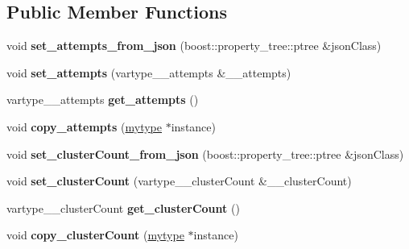 \subsection*{Public Member Functions}
\begin{DoxyCompactItemize}
\item 
\mbox{\label{classfilter_1_1algos_1_1_kmeans_a0201c86dca1b5ab33220846e1782e0f4}} 
void {\bfseries set\+\_\+attempts\+\_\+from\+\_\+json} (boost\+::property\+\_\+tree\+::ptree \&json\+Class)
\item 
\mbox{\label{classfilter_1_1algos_1_1_kmeans_ab7281ef60850bbed75e8669bc6aa63ea}} 
void {\bfseries set\+\_\+attempts} (vartype\+\_\+\+\_\+attempts \&\+\_\+\+\_\+attempts)
\item 
\mbox{\label{classfilter_1_1algos_1_1_kmeans_a62bd2f8afbd1171aaf701383a1b78fed}} 
vartype\+\_\+\+\_\+attempts {\bfseries get\+\_\+attempts} ()
\item 
\mbox{\label{classfilter_1_1algos_1_1_kmeans_a8d4654ad68ed3584c5a66ee5ab6f667d}} 
void {\bfseries copy\+\_\+attempts} (\hyperlink{classfilter_1_1algos_1_1_kmeans}{mytype} $\ast$instance)
\item 
\mbox{\label{classfilter_1_1algos_1_1_kmeans_a9c7fc587884f89e47034182505233704}} 
void {\bfseries set\+\_\+cluster\+Count\+\_\+from\+\_\+json} (boost\+::property\+\_\+tree\+::ptree \&json\+Class)
\item 
\mbox{\label{classfilter_1_1algos_1_1_kmeans_a8370849860659a78434cc3534f8035ef}} 
void {\bfseries set\+\_\+cluster\+Count} (vartype\+\_\+\+\_\+cluster\+Count \&\+\_\+\+\_\+cluster\+Count)
\item 
\mbox{\label{classfilter_1_1algos_1_1_kmeans_afd7fa83e1fff6314e84cbdeb83400e04}} 
vartype\+\_\+\+\_\+cluster\+Count {\bfseries get\+\_\+cluster\+Count} ()
\item 
\mbox{\label{classfilter_1_1algos_1_1_kmeans_a318329f4747de4f9219dff937480ea33}} 
void {\bfseries copy\+\_\+cluster\+Count} (\hyperlink{classfilter_1_1algos_1_1_kmeans}{mytype} $\ast$instance)

\end{DoxyCompactItemize}
